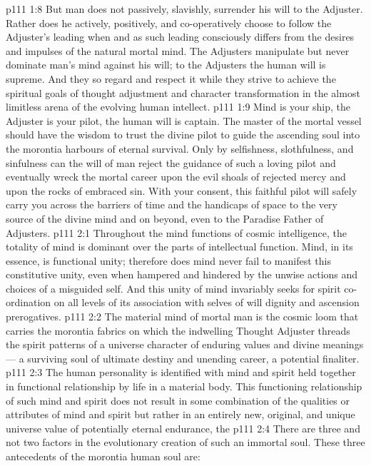 \vs p111 1:8 But man does not passively, slavishly, surrender his will to the Adjuster. Rather does he actively, positively, and co\hyp{}operatively choose to follow the Adjuster’s leading when and as such leading consciously differs from the desires and impulses of the natural mortal mind. The Adjusters manipulate but never dominate man’s mind against his will; to the Adjusters the human will is supreme. And they so regard and respect it while they strive to achieve the spiritual goals of thought adjustment and character transformation in the almost limitless arena of the evolving human intellect.
\vs p111 1:9 \pc Mind is your ship, the Adjuster is your pilot, the human will is captain. The master of the mortal vessel should have the wisdom to trust the divine pilot to guide the ascending soul into the morontia harbours of eternal survival. Only by selfishness, slothfulness, and sinfulness can the will of man reject the guidance of such a loving pilot and eventually wreck the mortal career upon the evil shoals of rejected mercy and upon the rocks of embraced sin. With your consent, this faithful pilot will safely carry you across the barriers of time and the handicaps of space to the very source of the divine mind and on beyond, even to the Paradise Father of Adjusters.
\vs p111 2:1 Throughout the mind functions of cosmic intelligence, the totality of mind is dominant over the parts of intellectual function. Mind, in its essence, is functional unity; therefore does mind never fail to manifest this constitutive unity, even when hampered and hindered by the unwise actions and choices of a misguided self. And this unity of mind invariably seeks for spirit co\hyp{}ordination on all levels of its association with selves of will dignity and ascension prerogatives.
\vs p111 2:2 The material mind of mortal man is the cosmic loom that carries the morontia fabrics on which the indwelling Thought Adjuster threads the spirit patterns of a universe character of enduring values and divine meanings --- a surviving soul of ultimate destiny and unending career, a potential finaliter.
\vs p111 2:3 The human personality is identified with mind and spirit held together in functional relationship by life in a material body. This functioning relationship of such mind and spirit does not result in some combination of the qualities or attributes of mind and spirit but rather in an entirely new, original, and unique universe value of potentially eternal endurance, the 
\vs p111 2:4 \pc There are three and not two factors in the evolutionary creation of such an immortal soul. These three antecedents of the morontia human soul are:
